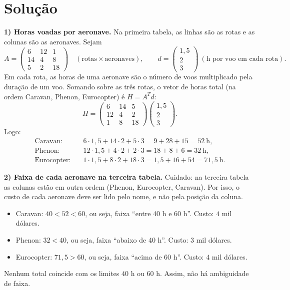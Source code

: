 \documentclass{article}%
\begin{document}
\section*{Solução}

\textbf{1) Horas voadas por aeronave.} Na primeira tabela, as linhas são as rotas e as colunas são as aeronaves. Sejam
\[
A=\begin{pmatrix} 6 & 12 & 1\\ 14 & 4 & 8\\ 5 & 2 & 18\end{pmatrix}
\quad(\text{rotas}\times\text{aeronaves}),
\qquad
d=\begin{pmatrix}1{,}5\\ 2\\ 3\end{pmatrix}\ (\text{h por voo em cada rota}).
\]
Em cada rota, as horas de uma aeronave são o número de voos multiplicado pela duração de um voo. Somando sobre as três rotas, o vetor de horas total (na ordem Caravan, Phenon, Eurocopter) é $H=A^{T}d$:
\[
H=\begin{pmatrix} 6 & 14 & 5\\ 12 & 4 & 2\\ 1 & 8 & 18\end{pmatrix}
\begin{pmatrix}1{,}5\\ 2\\ 3\end{pmatrix}.
\]
Logo:
\begin{align*}
\text{Caravan:}&\quad 6\cdot 1{,}5+14\cdot 2+5\cdot 3=9+28+15=52\ \text{h},\\
\text{Phenon:}&\quad 12\cdot 1{,}5+4\cdot 2+2\cdot 3=18+8+6=32\ \text{h},\\
\text{Eurocopter:}&\quad 1\cdot 1{,}5+8\cdot 2+18\cdot 3=1{,}5+16+54=71{,}5\ \text{h}.
\end{align*}

\textbf{2) Faixa de cada aeronave na terceira tabela.} Cuidado: na terceira tabela as colunas estão em outra ordem (Phenon, Eurocopter, Caravan). Por isso, o custo de cada aeronave deve ser lido pelo nome, e não pela posição da coluna.
\begin{itemize}
\item Caravan: $40<52<60$, ou seja, faixa ``entre 40 h e 60 h''. Custo: $4$ mil dólares.
\item Phenon: $32<40$, ou seja, faixa ``abaixo de 40 h''. Custo: $3$ mil dólares.
\item Eurocopter: $71{,}5>60$, ou seja, faixa ``acima de 60 h''. Custo: $4$ mil dólares.
\end{itemize}
Nenhum total coincide com os limites $40$ h ou $60$ h. Assim, não há ambiguidade de faixa.
\end{document}
